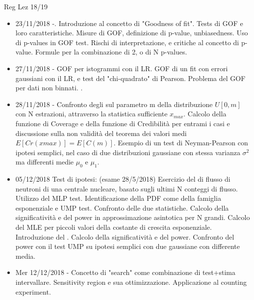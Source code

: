 \begin{frame}[allowframebreaks]{Reg Lez 18/19}
\begin{itemize}
    \item 23/11/2018 -. Introduzione al concetto di "Goodness of fit". Tests di GOF e loro caratteristiche. Misure di GOF, definizione di p-value, unbiasedness. Uso di p-values in GOF test. Rischi di interpretazione, e critiche al concetto di p-value. Formule per la combinazione di 2, o di N p-values.
    
    \item 27/11/2018 - GOF per istogrammi con il LR. GOF di un fit con errori gaussiani con il LR, e test del "chi-quadrato" di Pearson. Problema del GOF per dati non binnati. .
    
    \item 28/11/2018 - Confronto degli  sul parametro m della distribuzione $U[0,m]$ con N estrazioni, attraverso la statistica sufficiente $x_{max}$. Calcolo della funzione di Coverage e della funzione di Credibilità per entrami i casi e discussione sulla non validità del teorema dei valori medi $E[Cr(xmax)] = E[C(m)]$. Esempio di un test di Neyman-Pearson con ipotesi semplici, nel caso di due distribuzioni gaussiane con stessa varianza $\sigma^2$ ma differenti medie $\mu_0$ e $\mu_1$.
    
    \item  05/12/2018 Test di ipotesi: (esame 28/5/2018) Esercizio del  di flusso di neutroni di una centrale nucleare, basato sugli ultimi N conteggi di flusso. Utilizzo del MLP test. Identificazione della PDF come della famiglia esponenziale e UMP test. Confronto delle due statistiche. Calcolo della significatività e del power in approssimazione asintotica per N grandi. Calcolo del MLE per piccoli valori della costante di crescita esponenziale. Introduzione del . Calcolo della significatività e del power. Confronto del power con il test UMP su ipotesi semplici con due gaussiane con differente media.
    
    \item Mer 12/12/2018 - Concetto di "search" come combinazione di test+stima intervallare. Sensitivity region e sua ottimizzazione. Applicazione al counting experiment.
    \end{itemize}

\end{frame}


